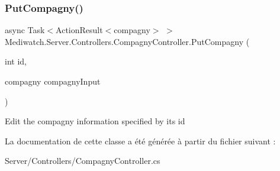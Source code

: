\subsubsection{\texorpdfstring{Put\+Compagny()}{PutCompagny()}}
{\footnotesize\ttfamily async Task$<$Action\+Result$<$compagny$>$ $>$ Mediwatch.\+Server.\+Controllers.\+Compagny\+Controller.\+Put\+Compagny (\begin{DoxyParamCaption}\item[{int}]{id,  }\item[{compagny}]{compagny\+Input }\end{DoxyParamCaption})\hspace{0.3cm}{\ttfamily [inline]}}

Edit the compagny information specified by its id 

La documentation de cette classe a été générée à partir du fichier suivant \+:\begin{DoxyCompactItemize}
\item 
Server/\+Controllers/Compagny\+Controller.\+cs\end{DoxyCompactItemize}

